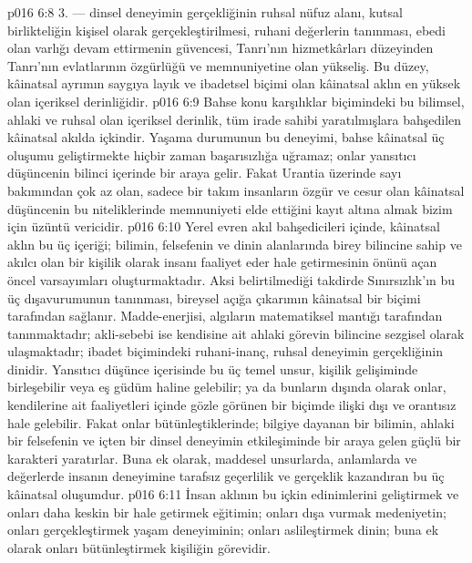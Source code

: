 \vs p016 6:8 3.\bibnobreakspace {} --- dinsel deneyimin gerçekliğinin ruhsal nüfuz alanı, kutsal birlikteliğin kişisel olarak gerçekleştirilmesi, ruhani değerlerin tanınması, ebedi olan varlığı devam ettirmenin güvencesi, Tanrı’nın hizmetkârları düzeyinden Tanrı’nın evlatlarının özgürlüğü ve memnuniyetine olan yükseliş. Bu düzey, kâinatsal ayrımın saygıya layık ve ibadetsel biçimi olan kâinatsal aklın en yüksek olan içeriksel derinliğidir.
\vs p016 6:9 Bahse konu karşılıklar biçimindeki bu bilimsel, ahlaki ve ruhsal olan içeriksel derinlik, tüm irade sahibi yaratılmışlara bahşedilen kâinatsal akılda içkindir. Yaşama durumunun bu deneyimi, bahse kâinatsal üç oluşumu geliştirmekte hiçbir zaman başarısızlığa uğramaz; onlar yansıtıcı düşüncenin bilinci içerinde bir araya gelir. Fakat Urantia üzerinde sayı bakımından çok az olan, sadece bir takım insanların özgür ve cesur olan kâinatsal düşüncenin bu niteliklerinde memnuniyeti elde ettiğini kayıt altına almak bizim için üzüntü vericidir.
\vs p016 6:10 Yerel evren akıl bahşedicileri içinde, kâinatsal aklın bu üç içeriği; bilimin, felsefenin ve dinin alanlarında birey bilincine sahip ve akılcı olan bir kişilik olarak insanı faaliyet eder hale getirmesinin önünü açan öncel varsayımları oluşturmaktadır. Aksi belirtilmediği takdirde Sınırsızlık’ın bu üç dışavurumunun  tanınması, bireysel açığa çıkarımın kâinatsal bir biçimi tarafından sağlanır. Madde\hyp{}enerjisi, algıların matematiksel mantığı tarafından tanınmaktadır; akli\hyp{}sebebi ise kendisine ait ahlaki görevin bilincine sezgisel olarak ulaşmaktadır; ibadet biçimindeki ruhani\hyp{}inanç, ruhsal deneyimin gerçekliğinin dinidir. Yansıtıcı düşünce içerisinde bu üç temel unsur, kişilik gelişiminde birleşebilir veya eş güdüm haline gelebilir; ya da bunların dışında olarak onlar, kendilerine ait faaliyetleri içinde gözle görünen bir biçimde ilişki dışı ve orantısız hale gelebilir. Fakat onlar bütünleştiklerinde; bilgiye dayanan bir bilimin, ahlaki bir felsefenin ve içten bir dinsel deneyimin etkileşiminde bir araya gelen güçlü bir karakteri yaratırlar. Buna ek olarak, maddesel unsurlarda, anlamlarda ve değerlerde insanın deneyimine tarafsız geçerlilik ve gerçeklik kazandıran bu üç kâinatsal oluşumdur.
\vs p016 6:11 İnsan aklının bu içkin edinimlerini geliştirmek ve onları daha keskin bir hale getirmek eğitimin; onları dışa vurmak medeniyetin; onları gerçekleştirmek yaşam deneyiminin; onları aslileştirmek dinin; buna ek olarak onları bütünleştirmek kişiliğin görevidir.
